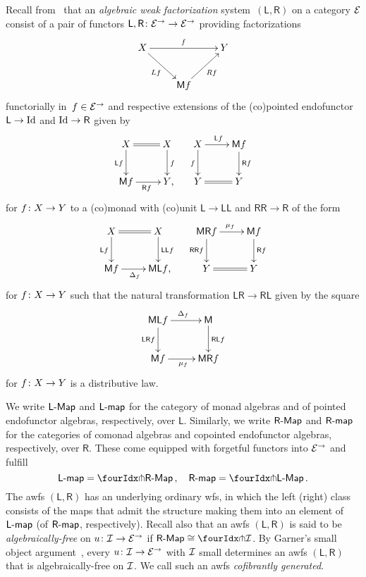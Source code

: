 \documentclass[reqno,10pt,a4paper,oneside,draft]{amsart}
\newcommand{\LL}{\mathsf{L}}
\newcommand{\RR}{\mathsf{R}}
\newcommand{\MM}{\mathsf{M}}
\begin{document}
{{Recall from~\cite{garner:small-object-argument,grandis-tholen-nwfs} that an \emph{algebraic weak factorization} system~$(\LL, \RR)$ on a category $\cal{E}$ consist of a pair of functors $\LL, \RR \co \cal{E}^\to \to \cal{E}^\to$ providing factorizations
\[
\xymatrix{
  X
  \ar[rr]^{f}
  \ar[dr]_{L f}
&&
  Y
\\&
  \MM f
  \ar[ur]_{R f}
}
\]
functorially in~$f \in \cal{E}^\to$ and respective extensions of the (co)pointed endofunctor $\LL \to \Id$ and $\Id \to \RR$ given by
\begin{align*}
\xymatrix{
  X
  \ar@{=}[r]
  \ar[d]_{\LL f}
&
  X
  \ar[d]^{f}
\\
  \MM f
  \ar[r]_{\RR f}
&
  Y
\rlap{,}}
&&
\xymatrix{
  X
  \ar[r]^{\LL f}
  \ar[d]_{f}
&
  \MM f
  \ar[d]^{\RR f}
\\
  Y
  \ar@{=}[r]
&
  Y
}
\end{align*}
for $f \co X \to Y$ to a (co)monad with (co)unit $\LL \to \LL \LL$ and $\RR \RR \to \RR$ of the form
\begin{align*}
\xymatrix{
  X
  \ar@{=}[r]
  \ar[d]_{\LL f}
&
  X
  \ar[d]^{\LL \LL f}
\\
  \MM f
  \ar[r]_{\Delta_f}
&
  \MM \LL f
\rlap{,}}
&&
\xymatrix{
  \MM \RR f
  \ar[r]^{\mu_f}
  \ar[d]_{\RR \RR f}
&
  \MM f
  \ar[d]^{\RR f}
\\
  Y
  \ar@{=}[r]
&
  Y
}
\end{align*}
for $f \co X \to Y$ such that the natural transformation $\LL \RR \to \RR \LL$ given by the square
\[
\xymatrix{
  \MM \LL f
  \ar[r]^{\Delta_f}
  \ar[d]_{\LL \RR f}
&
  \MM
  \ar[d]^{\RR \LL f}
\\
  \MM f
  \ar[r]_{\mu_f}
&
  \MM \RR f
}
\]
for $f \co X \to Y$ is a distributive law.

We write $\pCoalg{\LL}$ and $\pcoalg{\LL}$ for the category of monad algebras and of pointed endofunctor algebras, respectively, over $\LL$. Similarly, we write $\pAlg{\RR}$ and $\palg{\RR}$  for the categories of comonad algebras and copointed endofunctor algebras, respectively, over $\RR$. These come equipped with forgetful functors into $\cal{E}^\to$ and fulfill
\[
\pcoalg{\LL} = \liftl{\pAlg{\RR}}
\, , \quad
\palg{\RR} = \liftr{\pCoalg{\LL}}
\, .\]
The awfs $(\LL, \RR)$ has an underlying ordinary wfs, in which the left (right) class consists of the maps that admit the structure making them into an element of $\pcoalg{\LL}$ (of $\palg{\RR}$, respectively).
Recall also that an awfs
$(\LL, \RR)$ is said to be \emph{algebraically-free} on $u \co \cal{I} \to \cal{E}^\to$ if $\pAlg{\RR} \iso \liftr{\cal{I}}$.
By Garner's small object argument~\cite{garner:small-object-argument}, every $u \co \cal{I} \to \cal{E}^\to$ with $\cal{I}$ small determines an awfs $(\LL, \RR)$ that is algebraically-free on $\cal{I}$.
We call such an awfs \emph{cofibrantly generated}.

}}
\end{document}
